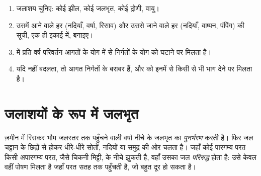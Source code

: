 \begin{method}[जल का बजट]\label{met:g10:freshwater-resources:budget}
\begin{enumerate}
  \item जलाशय चुनिए: कोई झील, कोई जलभृत, कोई द्रोणी, वायु।
  \item उसमें आने वाले हर  (नदियाँ, वर्षा, रिसाव) और उससे जाने वाले हर 
        (नदियाँ, वाष्पन, पंपिंग) की सूची, एक ही इकाई में, बनाइए।
  \item {} में प्रति वर्ष परिवर्तन आगतों के योग में से निर्गतों के
        योग को घटाने पर मिलता है।
  \item यदि  नहीं बदलता, तो आगत निर्गतों के बराबर हैं, और   को इनमें से किसी से भी भाग देने पर मिलता है।
\end{enumerate}
\end{method}

\section{जलाशयों के रूप में जलभृत}

ज़मीन में रिसकर भौम जलस्तर तक पहुँचने वाली वर्षा नीचे के जलभृत का
\emph{पुनर्भरण} करती है। फिर जल चट्टान के छिद्रों से होकर धीरे-धीरे
सोतों, नदियों या समुद्र की ओर चलता है। जहाँ कोई
पारगम्य परत किसी अपारगम्य परत, जैसे चिकनी मिट्टी, के नीचे झुकती है, वहाँ उसका जल
\emph{परिरुद्ध} होता है: उसे केवल वहीं पोषण मिलता है जहाँ परत सतह तक पहुँचती है, जो
बहुत दूर हो सकता है।

